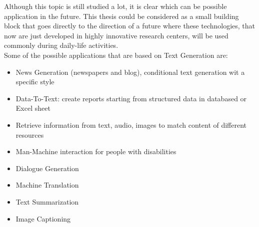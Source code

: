Although this topic is still studied a lot, it is clear which can be possible application in the future. This thesis could be considered as a small building block that goes directly to the direction of a future where these technologies, that now are just developed in highly innovative research centers, will be used commonly during daily-life activities. \\
Some of the possible applications that are based on Text Generation are: 
\begin{itemize}
	\item News Generation (newspapers and blog), conditional text generation wit a specific style
	\item Data-To-Text: create reports starting from structured data in databased or Excel sheet
	\item Retrieve information from text, audio, images to match content of different resources
	\item Man-Machine interaction for people with disabilities
	\item Dialogue Generation
	\item Machine Translation
	\item Text Summarization
	\item Image Captioning
\end{itemize}